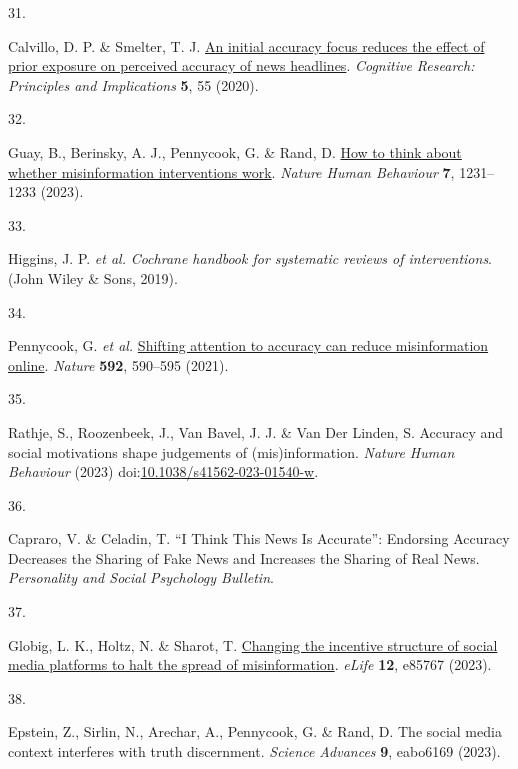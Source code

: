 \documentclass[
  man]{apa6}
\newlength{\cslhangindent}
\newlength{\csllabelwidth}
\newenvironment{CSLReferences}[2] %
 {\begin{list}{}{%
  \setlength{\itemindent}{0pt}
  \setlength{\leftmargin}{0pt}
  \setlength{\parsep}{0pt}
  \ifodd #1
   \setlength{\leftmargin}{\cslhangindent}
   \setlength{\itemindent}{-1\cslhangindent}
  \fi
  \setlength{\itemsep}{#2\baselineskip}}}
 {\end{list}}
\newcommand{\CSLLeftMargin}[1]{\parbox[t]{\csllabelwidth}{\strut#1\strut}}
\newcommand{\CSLRightInline}[1]{\parbox[t]{\linewidth - \csllabelwidth}{\strut#1\strut}}
\begin{document}
\begin{CSLReferences}{0}{0}
\CSLLeftMargin{31. }%
\CSLRightInline{Calvillo, D. P. \& Smelter, T. J. \href{https://doi.org/10.1186/s41235-020-00257-y}{An initial accuracy focus reduces the effect of prior exposure on perceived accuracy of news headlines}. \emph{Cognitive Research: Principles and Implications} \textbf{5}, 55 (2020).}

\CSLLeftMargin{32. }%
\CSLRightInline{Guay, B., Berinsky, A. J., Pennycook, G. \& Rand, D. \href{https://doi.org/10.1038/s41562-023-01667-w}{How to think about whether misinformation interventions work}. \emph{Nature Human Behaviour} \textbf{7}, 1231--1233 (2023).}

\CSLLeftMargin{33. }%
\CSLRightInline{Higgins, J. P. \emph{et al.} \emph{Cochrane handbook for systematic reviews of interventions}. (John Wiley \& Sons, 2019).}

\CSLLeftMargin{34. }%
\CSLRightInline{Pennycook, G. \emph{et al.} \href{https://doi.org/10.1038/s41586-021-03344-2}{Shifting attention to accuracy can reduce misinformation online}. \emph{Nature} \textbf{592}, 590--595 (2021).}

\CSLLeftMargin{35. }%
\CSLRightInline{Rathje, S., Roozenbeek, J., Van Bavel, J. J. \& Van Der Linden, S. Accuracy and social motivations shape judgements of (mis)information. \emph{Nature Human Behaviour} (2023) doi:\href{https://doi.org/10.1038/s41562-023-01540-w}{10.1038/s41562-023-01540-w}.}

\CSLLeftMargin{36. }%
\CSLRightInline{Capraro, V. \& Celadin, T. {``}I Think This News Is Accurate{''}: Endorsing Accuracy Decreases the Sharing of Fake News and Increases the Sharing of Real News. \emph{Personality and Social Psychology Bulletin}.}

\CSLLeftMargin{37. }%
\CSLRightInline{Globig, L. K., Holtz, N. \& Sharot, T. \href{https://doi.org/10.7554/eLife.85767}{Changing the incentive structure of social media platforms to halt the spread of misinformation}. \emph{eLife} \textbf{12}, e85767 (2023).}

\CSLLeftMargin{38. }%
\CSLRightInline{*Epstein, Z., Sirlin, N., Arechar, A., Pennycook, G. \& Rand, D. The social media context interferes with truth discernment. \emph{Science Advances} \textbf{9}, eabo6169 (2023).}


\end{CSLReferences}
\end{document}
